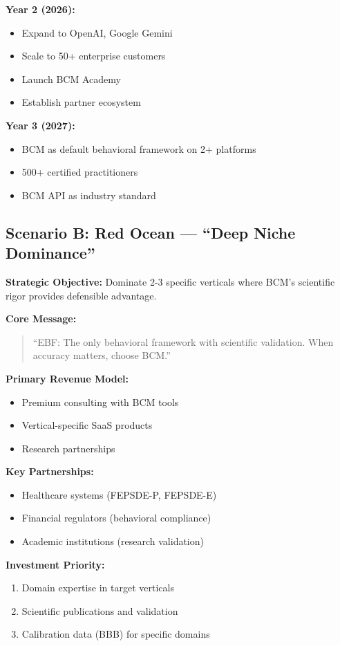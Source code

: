 \textbf{Year 2 (2026):}
\begin{itemize}
\item Expand to OpenAI, Google Gemini
\item Scale to 50+ enterprise customers
\item Launch BCM Academy
\item Establish partner ecosystem
\end{itemize}

\textbf{Year 3 (2027):}
\begin{itemize}
\item BCM as default behavioral framework on 2+ platforms
\item 500+ certified practitioners
\item BCM API as industry standard
\end{itemize}


\subsection{Scenario B: Red Ocean --- ``Deep Niche Dominance''}

\begin{tcolorbox}[colback=red!5!white, colframe=red!75!black,
    title=Strategic Position B: Deep Niche Dominance]

\textbf{Strategic Objective:}
Dominate 2-3 specific verticals where BCM's scientific rigor provides defensible advantage.

\textbf{Core Message:}
\begin{quote}
``EBF: The only behavioral framework with scientific validation. When accuracy matters, choose BCM.''
\end{quote}

\textbf{Primary Revenue Model:}
\begin{itemize}[nosep]
\item Premium consulting with BCM tools
\item Vertical-specific SaaS products
\item Research partnerships
\end{itemize}

\textbf{Key Partnerships:}
\begin{itemize}[nosep]
\item Healthcare systems (FEPSDE-P, FEPSDE-E)
\item Financial regulators (behavioral compliance)
\item Academic institutions (research validation)
\end{itemize}

\textbf{Investment Priority:}
\begin{enumerate}[nosep]
\item Domain expertise in target verticals
\item Scientific publications and validation
\item Calibration data (BBB) for specific domains
\end{enumerate}

\end{tcolorbox}

